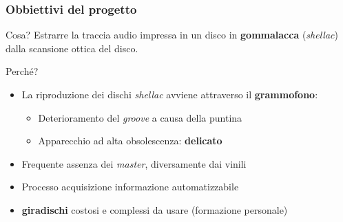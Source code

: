 \begin{frame}

\frametitle{Obbiettivi del progetto}

\begin{block}{Cosa?}
Estrarre la traccia audio impressa in un disco in \textbf{gommalacca}
(\emph{shellac}) dalla scansione ottica del disco.
\end{block}

\begin{block}{Perché?}
\begin{itemize}
\item La riproduzione dei dischi \emph{shellac} avviene attraverso il \textbf{grammofono}:
\begin{itemize}
\item Deterioramento del \emph{groove} a causa della puntina
\item Apparecchio ad alta obsolescenza: \textbf{delicato}
\end{itemize}
\item Frequente assenza dei \emph{master}, diversamente dai vinili
\item Processo acquisizione informazione automatizzabile
\item \textbf{giradischi} costosi e complessi da usare (formazione personale)
\end{itemize}
\end{block}

\end{frame}
